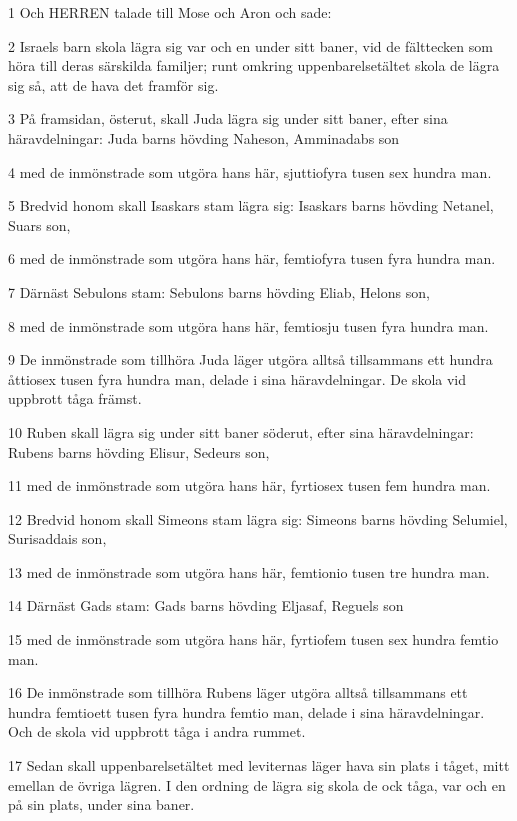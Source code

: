 \par 1 Och HERREN talade till Mose och Aron och sade:
\par 2 Israels barn skola lägra sig var och en under sitt baner, vid de fälttecken som höra till deras särskilda familjer; runt omkring uppenbarelsetältet skola de lägra sig så, att de hava det framför sig.
\par 3 På framsidan, österut, skall Juda lägra sig under sitt baner, efter sina häravdelningar: Juda barns hövding Naheson, Amminadabs son
\par 4 med de inmönstrade som utgöra hans här, sjuttiofyra tusen sex hundra man.
\par 5 Bredvid honom skall Isaskars stam lägra sig: Isaskars barns hövding Netanel, Suars son,
\par 6 med de inmönstrade som utgöra hans här, femtiofyra tusen fyra hundra man.
\par 7 Därnäst Sebulons stam: Sebulons barns hövding Eliab, Helons son,
\par 8 med de inmönstrade som utgöra hans här, femtiosju tusen fyra hundra man.
\par 9 De inmönstrade som tillhöra Juda läger utgöra alltså tillsammans ett hundra åttiosex tusen fyra hundra man, delade i sina häravdelningar. De skola vid uppbrott tåga främst.
\par 10 Ruben skall lägra sig under sitt baner söderut, efter sina häravdelningar: Rubens barns hövding Elisur, Sedeurs son,
\par 11 med de inmönstrade som utgöra hans här, fyrtiosex tusen fem hundra man.
\par 12 Bredvid honom skall Simeons stam lägra sig: Simeons barns hövding Selumiel, Surisaddais son,
\par 13 med de inmönstrade som utgöra hans här, femtionio tusen tre hundra man.
\par 14 Därnäst Gads stam: Gads barns hövding Eljasaf, Reguels son
\par 15 med de inmönstrade som utgöra hans här, fyrtiofem tusen sex hundra femtio man.
\par 16 De inmönstrade som tillhöra Rubens läger utgöra alltså tillsammans ett hundra femtioett tusen fyra hundra femtio man, delade i sina häravdelningar. Och de skola vid uppbrott tåga i andra rummet.
\par 17 Sedan skall uppenbarelsetältet med leviternas läger hava sin plats i tåget, mitt emellan de övriga lägren. I den ordning de lägra sig skola de ock tåga, var och en på sin plats, under sina baner.
